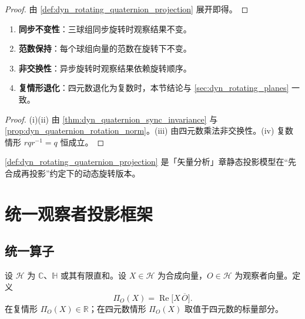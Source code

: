 \begin{proof}
由 \cref{def:dyn_rotating_quaternion_projection} 展开即得。
\end{proof}

\begin{property}[旋转三球组的基本性质]\label{prop:dyn_rotating_quaternion_properties}
\begin{enumerate}[label=(\roman*)]
    \item \textbf{同步不变性}：三球组同步旋转时观察结果不变。
    \item \textbf{范数保持}：每个球组向量的范数在旋转下不变。
    \item \textbf{非交换性}：异步旋转时观察结果依赖旋转顺序。
    \item \textbf{复情形退化}：四元数退化为复数时，本节结论与 \cref{sec:dyn_rotating_planes} 一致。
\end{enumerate}
\end{property}

\begin{proof}
(i)(ii) 由 \cref{thm:dyn_quaternion_sync_invariance} 与 \cref{prop:dyn_quaternion_rotation_norm}。(iii) 由四元数乘法非交换性。(iv) 复数情形 $rqr^{-1}=q$ 恒成立。
\end{proof}

\begin{remark}\label{rem:dyn_rotating_quaternion_static_relation}
\cref{def:dyn_rotating_quaternion_projection} 是「矢量分析」章静态投影模型在“先合成再投影”约定下的动态旋转版本。
\end{remark}

\section{统一观察者投影框架}
\label{sec:dyn_unified}

\subsection{统一算子}

\begin{definition}[统一观察者算子]\label{def:dyn_unified_operator}
设 $\mathcal H$ 为 $\mathbb C$、$\mathbb H$ 或其有限直和。设 $X\in\mathcal H$ 为合成向量，$O\in\mathcal H$ 为观察者向量。定义
\[
\Pi_O(X)=\operatorname{Re}\!\big[X\,\overline O\big].
\]
在复情形 $\Pi_O(X)\in\mathbb R$；在四元数情形 $\Pi_O(X)$ 取值于四元数的标量部分。
\end{definition}

